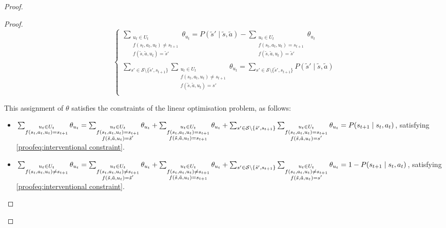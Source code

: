 \begin{proof}
\begin{proof}
\[\begin{cases}
    \sum_{\substack{u_t \in U_t \\f(s_t, a_t, u_t) \neq s_{t+1} \\ f(\tilde{s}, \tilde{a}, u_t) = \tilde{s}'}}{\theta_{u_t}} = P(\tilde{s}' \mid \tilde{s}, \tilde{a}) - \sum_{\substack{u_t \in U_t \\f(s_t, a_t, u_t) = s_{t+1} \\ f(\tilde{s}, \tilde{a}, u_t) = \tilde{s}'}}{\theta_{u_t}} \\
    
    \sum_{s' \in \mathcal{S}\setminus\{\tilde{s}', s_{t+1}\}}\sum_{\substack{u_t \in U_t \\f(s_t, a_t, u_t) \neq s_{t+1} \\ f(\tilde{s}, \tilde{a}, u_t) = s'}}{\theta_{u_t}} = \sum_{s' \in \mathcal{S}\setminus\{\tilde{s}', s_{t+1}\}}P(\tilde{s}' \mid \tilde{s}, \tilde{a})\\
\end{cases}
\]

    This assignment of $\theta$ satisfies the constraints of the linear optimisation problem, as follows:

    \begin{itemize}        
    \item $\sum_{\substack{u_t \in U_t \\f(s_t, a_t, u_t) = s_{t+1}}} \theta_{u_t} = \sum_{\substack{u_t \in U_t \\f(s_t, a_t, u_t) = s_{t+1} \\ f(\tilde{s}, \tilde{a}, u_t) = \tilde{s}'}} \theta_{u_t} + \sum_{\substack{u_t \in U_t \\f(s_t, a_t, u_t) = s_{t+1} \\ f(\tilde{s}, \tilde{a}, u_t) = s_{t+1}}} \theta_{u_t} + \sum_{s' \in \mathcal{S}\setminus\{\tilde{s}', s_{t+1}\}}\sum_{\substack{u_t \in U_t \\f(s_t, a_t, u_t) = s_{t+1} \\ f(\tilde{s}, \tilde{a}, u_t) = s'}}{\theta_{u_t}} \\ = P(s_{t+1} \mid s_t, a_t)$, satisfying \eqref{proofeq:interventional constraint}.

    \item $\sum_{\substack{u_t \in U_t\\f(s_t, a_t, u_t) \neq s_{t+1}}}{\theta_{u_t}} = \sum_{\substack{u_t \in U_t \\f(s_t, a_t, u_t) \neq s_{t+1} \\ f(\tilde{s}, \tilde{a}, u_t) = \tilde{s}'}} \theta_{u_t} + \sum_{\substack{u_t \in U_t \\f(s_t, a_t, u_t) \neq s_{t+1} \\ f(\tilde{s}, \tilde{a}, u_t) = s_{t+1}}} \theta_{u_t} + \sum_{s' \in \mathcal{S}\setminus\{\tilde{s}', s_{t+1}\}}\sum_{\substack{u_t \in U_t \\f(s_t, a_t, u_t) \neq s_{t+1} \\ f(\tilde{s}, \tilde{a}, u_t) = s'}}{\theta_{u_t}} \\=1 -
    P(s_{t+1} \mid s_t, a_t)$, satisfying \eqref{proofeq:interventional constraint}.
    

\end{itemize}
\end{proof}
\end{proof}
